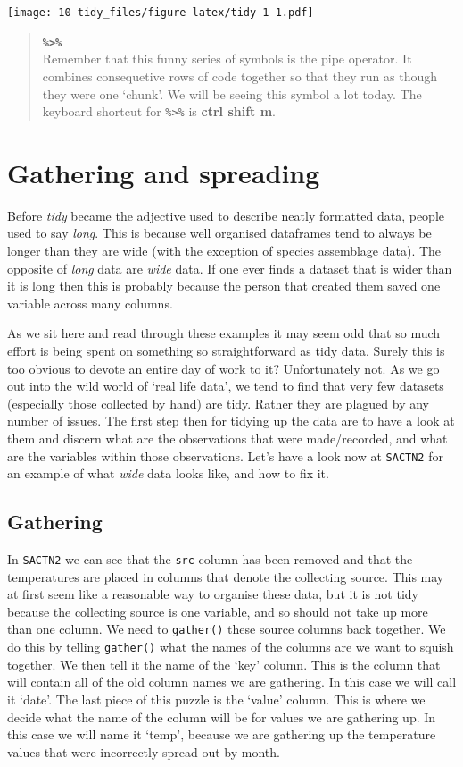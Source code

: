 \documentclass[]{book}
\theoremstyle{definition}
\theoremstyle{definition}
\theoremstyle{definition}
\theoremstyle{remark}
\begin{document}
\texttt{[image: 10-tidy\_files/figure-latex/tidy-1-1.pdf]}

\begin{quote}
\textbf{\texttt{\%\textgreater{}\%}}\\
Remember that this funny series of symbols is the pipe operator. It
combines consequetive rows of code together so that they run as though
they were one `chunk'. We will be seeing this symbol a lot today. The
keyboard shortcut for \texttt{\%\textgreater{}\%} is \textbf{ctrl shift
m}.
\end{quote}

\section{Gathering and spreading}\label{gathering-and-spreading}

Before \emph{tidy} became the adjective used to describe neatly
formatted data, people used to say \emph{long}. This is because well
organised dataframes tend to always be longer than they are wide (with
the exception of species assemblage data). The opposite of \emph{long}
data are \emph{wide} data. If one ever finds a dataset that is wider
than it is long then this is probably because the person that created
them saved one variable across many columns.

As we sit here and read through these examples it may seem odd that so
much effort is being spent on something so straightforward as tidy data.
Surely this is too obvious to devote an entire day of work to it?
Unfortunately not. As we go out into the wild world of `real life data',
we tend to find that very few datasets (especially those collected by
hand) are tidy. Rather they are plagued by any number of issues. The
first step then for tidying up the data are to have a look at them and
discern what are the observations that were made/recorded, and what are
the variables within those observations. Let's have a look now at
\texttt{SACTN2} for an example of what \emph{wide} data looks like, and
how to fix it.

\subsection{Gathering}\label{gathering}

In \texttt{SACTN2} we can see that the \texttt{src} column has been
removed and that the temperatures are placed in columns that denote the
collecting source. This may at first seem like a reasonable way to
organise these data, but it is not tidy because the collecting source is
one variable, and so should not take up more than one column. We need to
\texttt{gather()} these source columns back together. We do this by
telling \texttt{gather()} what the names of the columns are we want to
squish together. We then tell it the name of the `key' column. This is
the column that will contain all of the old column names we are
gathering. In this case we will call it `date'. The last piece of this
puzzle is the `value' column. This is where we decide what the name of
the column will be for values we are gathering up. In this case we will
name it `temp', because we are gathering up the temperature values that
were incorrectly spread out by month.
\end{document}
